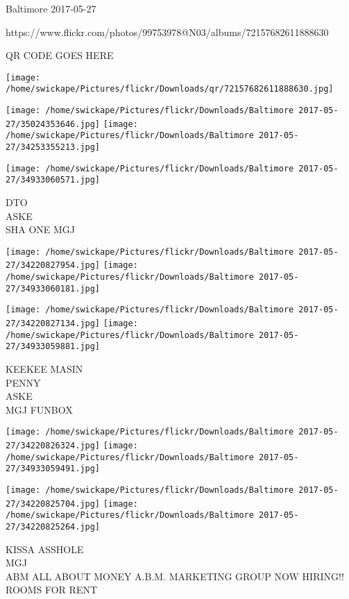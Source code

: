 \documentclass[10pt,letterpaper]{article}
\begin{document}
Baltimore 2017-05-27

https://www.flickr.com/photos/99753978@N03/albums/72157682611888630

QR CODE GOES HERE

\texttt{[image: /home/swickape/Pictures/flickr/Downloads/qr/72157682611888630.jpg]}
\pagebreak

\texttt{[image: /home/swickape/Pictures/flickr/Downloads/Baltimore 2017-05-27/35024353646.jpg]}
\texttt{[image: /home/swickape/Pictures/flickr/Downloads/Baltimore 2017-05-27/34253355213.jpg]}

\vspace{0.25in}
\texttt{[image: /home/swickape/Pictures/flickr/Downloads/Baltimore 2017-05-27/34933060571.jpg]}

DTO\\
ASKE\\
SHA ONE MGJ\\
\pagebreak

\texttt{[image: /home/swickape/Pictures/flickr/Downloads/Baltimore 2017-05-27/34220827954.jpg]}
\texttt{[image: /home/swickape/Pictures/flickr/Downloads/Baltimore 2017-05-27/34933060181.jpg]}

\texttt{[image: /home/swickape/Pictures/flickr/Downloads/Baltimore 2017-05-27/34220827134.jpg]}
\texttt{[image: /home/swickape/Pictures/flickr/Downloads/Baltimore 2017-05-27/34933059881.jpg]}

KEEKEE MASIN\\
PENNY\\
ASKE\\
MGJ FUNBOX\\
\pagebreak

\texttt{[image: /home/swickape/Pictures/flickr/Downloads/Baltimore 2017-05-27/34220826324.jpg]}
\texttt{[image: /home/swickape/Pictures/flickr/Downloads/Baltimore 2017-05-27/34933059491.jpg]}

\texttt{[image: /home/swickape/Pictures/flickr/Downloads/Baltimore 2017-05-27/34220825704.jpg]}
\texttt{[image: /home/swickape/Pictures/flickr/Downloads/Baltimore 2017-05-27/34220825264.jpg]}

KISSA ASSHOLE\\
MGJ\\
ABM ALL ABOUT MONEY A.B.M. MARKETING GROUP NOW HIRING!!\\
ROOMS FOR RENT\\
\pagebreak
\end{document}
